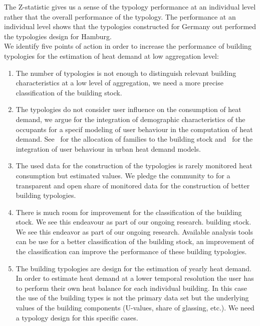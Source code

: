 \documentclass[authoryear,preprint,review,12pt]{elsarticle}
\begin{document}
\begin{linenumbers}
The Z-statistic gives us a sense of the typology performance at an individual
level rather that the overall performance of the typology. The performance at
an individual level shows that the typologies constructed for Germany out
performed the typologies design for Hamburg.\\

We identify five points of action in order to increase the performance of
building typologies for the estimation of heat demand at low aggregation level:

\begin{enumerate}
    \item The number of typologies is not enough to distinguish relevant
        building characteristics at a low level of aggregation, we need a more
        precise classification of the building stock.
    \item The typologies do not consider user influence on the consumption of
        heat demand, we argue for the integration of demographic
        characteristics of the occupants for a specif modeling of user
        behaviour in the computation of heat demand.
        See~\cite{Munoz.2014b} for the allocation of families to
        the building stock and~\cite{Munoz.2014c} for the integration of
        user behaviour in urban heat demand models.
    \item The used data for the construction of the typologies is rarely
        monitored heat consumption but estimated values. We pledge the
        community to for a transparent and open share of monitored data for the
        construction of better building typologies.
    \item There is much room for improvement for the classification of the
        building stock. We see this endeavour as part of our ongoing research.
        building stock. We see this endeavor as part of our ongoing research.
        Available analysis tools can be use for a better classification of the
        building stock, an improvement of the classification can improve the
        performance of these building typologies.
    \item The building typologies are design for the estimation of yearly heat
        demand. In order to estimate heat demand at a lower temporal resolution
        the user has to perform their own heat balance for each individual
        building. In this case the use of the building types is not the
        primary data set but the underlying values of the building components
        (U-values, share of glassing, etc.). We need a typology design for this
        specific cases.
\end{enumerate}


\end{linenumbers}
\end{document}
